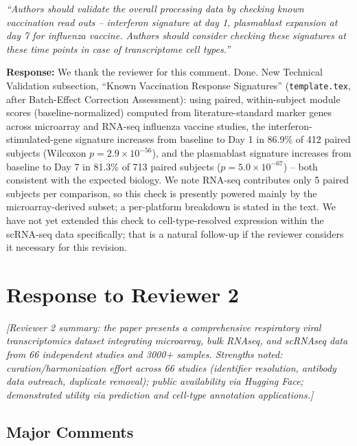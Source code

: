 \documentclass[11pt]{article}
\newcommand{\origcomment}[1]{\textit{``#1''}}
\newcommand{\filledresponse}[1]{%
  \par\medskip\noindent\textbf{Response:} #1\par
  \vspace{0.4cm}%
  \par\noindent\hrulefill\par\bigskip
}
\begin{document}
\begin{commentlist}
\item[R1-8.] \origcomment{Authors should validate the overall processing data by checking known
vaccination read outs -- interferon signature at day 1, plasmablast expansion at day 7 for
influenza vaccine. Authors should consider checking these signatures at these time points in case
of transcriptome cell types.}
\filledresponse{We thank the reviewer for this comment. Done. New Technical Validation subsection, ``Known Vaccination Response
Signatures'' (\texttt{template.tex}, after Batch-Effect Correction Assessment): using paired,
within-subject module scores (baseline-normalized) computed from literature-standard marker genes
across microarray and RNA-seq influenza vaccine studies, the interferon-stimulated-gene signature
increases from baseline to Day 1 in 86.9\% of 412 paired subjects (Wilcoxon $p=2.9\times10^{-56}$),
and the plasmablast signature increases from baseline to Day 7 in 81.3\% of 713 paired subjects
($p=5.0\times10^{-67}$) -- both consistent with the expected biology. We note RNA-seq contributes
only 5 paired subjects per comparison, so this check is presently powered mainly by the
microarray-derived subset; a per-platform breakdown is stated in the text. We have not yet extended
this check to cell-type-resolved expression within the scRNA-seq data specifically; that is a
natural follow-up if the reviewer considers it necessary for this revision.}

\end{commentlist}

\clearpage
\section*{Response to Reviewer 2}

\noindent\textit{[Reviewer 2 summary: the paper presents a comprehensive respiratory viral
transcriptomics dataset integrating microarray, bulk RNAseq, and scRNAseq data from 66 independent
studies and 3000+ samples. Strengths noted: curation/harmonization effort across 66 studies
(identifier resolution, antibody data outreach, duplicate removal); public availability via
Hugging Face; demonstrated utility via prediction and cell-type annotation applications.]}

\bigskip
\subsection*{Major Comments}
\end{document}
